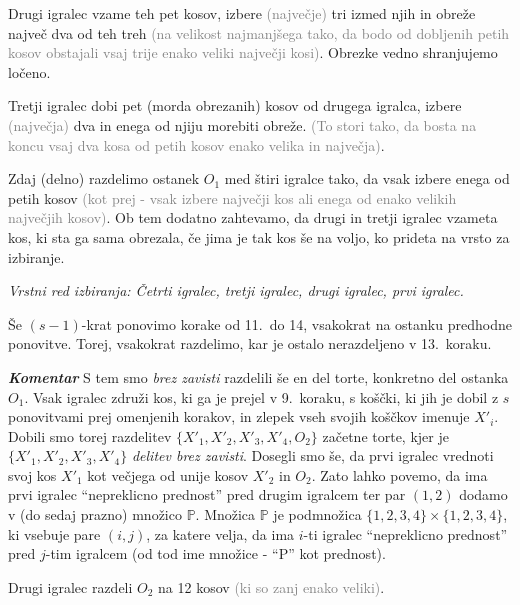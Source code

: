 \documentclass[a4paper,12pt]{article}
\def\P{\mathbb{P}}
\begin{document}
\begin{protokol}
\item Drugi igralec vzame teh pet kosov, izbere \textcolor{gray}{(največje)} tri izmed njih in obreže največ dva od teh treh \textcolor{gray}{(na velikost najmanjšega tako, da bodo od dobljenih petih kosov obstajali vsaj trije enako veliki največji kosi)}. Obrezke vedno shranjujemo ločeno.

\item Tretji igralec dobi pet (morda obrezanih) kosov od drugega igralca, izbere \textcolor{gray}{(največja)} dva in enega od njiju morebiti obreže. \textcolor{gray}{(To stori tako, da bosta na koncu vsaj dva kosa od petih kosov enako velika in največja)}.

\item Zdaj (delno) razdelimo ostanek $O_1$ med štiri igralce tako, da vsak izbere enega od petih kosov \textcolor{gray}{(kot prej - vsak izbere največji kos ali enega od enako velikih največjih kosov)}. Ob tem dodatno zahtevamo, da drugi in tretji igralec vzameta kos, ki sta ga sama obrezala, če jima je tak kos še na voljo, ko prideta na vrsto za izbiranje.

\textsl{Vrstni red izbiranja: Četrti igralec, tretji igralec, drugi igralec, prvi igralec.}

\item Še $(s - 1)$-krat ponovimo korake od 11.~do 14, vsakokrat na ostanku predhodne ponovitve. Torej, vsakokrat razdelimo, kar je ostalo nerazdeljeno v 13.~koraku.

\item [\textbf{\em Komentar}]  S tem smo {\em brez zavisti} razdelili še en del torte, konkretno del ostanka $O_1$. Vsak igralec združi kos, ki ga je prejel v 9.~koraku, s koščki, ki jih je dobil z $s$ ponovitvami prej omenjenih korakov, in zlepek vseh svojih koščkov imenuje $X'_i$. Dobili smo torej razdelitev ${\{X'_1, X'_2, X'_3, X'_4, O_2\}}$ začetne torte, kjer je ${\{X'_1, X'_2, X'_3, X'_4\}}$ {\em delitev brez zavisti}. Dosegli smo še, da prvi igralec vrednoti svoj kos $X'_1$ kot večjega od unije kosov $X'_2$ in $O_2$. Zato lahko povemo, da ima prvi igralec ``nepreklicno prednost'' pred drugim igralcem ter par $(1,2)$ dodamo v (do sedaj prazno) množico $\P$. Množica $\P$ je podmnožica ${\{1, 2, 3, 4\}} \times {\{1, 2, 3, 4\}}$, ki vsebuje pare $(i, j)$, za katere velja, da ima $i$-ti igralec ``nepreklicno prednost'' pred $j$-tim igralcem (od tod ime množice - ``P'' kot prednost).

\item Drugi igralec razdeli $O_2$ na 12 kosov \textcolor{gray}{(ki so zanj enako veliki)}.


\end{protokol}
\end{document}
